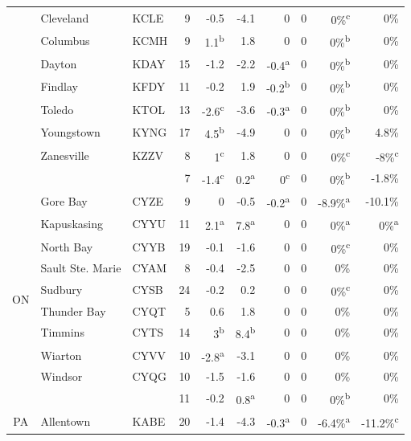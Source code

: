 \documentclass[twocol]{ametsoc}
\begin{document}
\begin{landscape}
\begin{table}[]
\begin{tabular}{@{}cllrrrrrrr@{}}
 & Cleveland & KCLE & 9 & -0.5 & -4.1 & 0 & 0 & 0\%\textsuperscript{c} & 0\% \\
 & Columbus & KCMH & 9 & 1.1\textsuperscript{b} & 1.8 & 0 & 0 & 0\%\textsuperscript{b} & 0\% \\
 & Dayton & KDAY & 15 & -1.2 & -2.2 & -0.4\textsuperscript{a} & 0 & 0\%\textsuperscript{b} & 0\% \\
 & Findlay & KFDY & 11 & -0.2 & 1.9 & -0.2\textsuperscript{b} & 0 & 0\%\textsuperscript{b} & 0\% \\
 & Toledo & KTOL & 13 & -2.6\textsuperscript{c} & -3.6 & -0.3\textsuperscript{a} & 0 & 0\%\textsuperscript{b} & 0\% \\
 & Youngstown & KYNG & 17 & 4.5\textsuperscript{b} & -4.9 & 0 & 0 & 0\%\textsuperscript{b} & 4.8\% \\
 & Zanesville & KZZV & 8 & 1\textsuperscript{c} & 1.8 & 0 & 0 & 0\%\textsuperscript{c} & -8\%\textsuperscript{c} \\ \cmidrule(l){2-10} 
 &  &  & 7 & -1.4\textsuperscript{c} & 0.2\textsuperscript{a} & 0\textsuperscript{c} & 0 & 0\%\textsuperscript{b} & -1.8\% \\ \midrule
\multirow{10}{*}{ON} & Gore Bay & CYZE & 9 & 0 & -0.5 & -0.2\textsuperscript{a} & 0 & -8.9\%\textsuperscript{a} & -10.1\% \\
 & Kapuskasing & CYYU & 11 & 2.1\textsuperscript{a} & 7.8\textsuperscript{a} & 0 & 0 & 0\%\textsuperscript{a} & 0\%\textsuperscript{a} \\
 & North Bay & CYYB & 19 & -0.1 & -1.6 & 0 & 0 & 0\%\textsuperscript{c} & 0\% \\
 & Sault Ste. Marie & CYAM & 8 & -0.4 & -2.5 & 0 & 0 & 0\% & 0\% \\
 & Sudbury & CYSB & 24 & -0.2 & 0.2 & 0 & 0 & 0\%\textsuperscript{c} & 0\% \\
 & Thunder Bay & CYQT & 5 & 0.6 & 1.8 & 0 & 0 & 0\% & 0\% \\
 & Timmins & CYTS & 14 & 3\textsuperscript{b} & 8.4\textsuperscript{b} & 0 & 0 & 0\% & 0\% \\
 & Wiarton & CYVV & 10 & -2.8\textsuperscript{a} & -3.1 & 0 & 0 & 0\% & 0\% \\
 & Windsor & CYQG & 10 & -1.5 & -1.6 & 0 & 0 & 0\% & 0\% \\ \cmidrule(l){2-10} 
 &  &  & 11 & -0.2 & 0.8\textsuperscript{a} & 0 & 0 & 0\%\textsuperscript{b} & 0\% \\ \midrule
\multirow{10}{*}{PA} & Allentown & KABE & 20 & -1.4 & -4.3 & -0.3\textsuperscript{a} & 0 & -6.4\%\textsuperscript{a} & -11.2\%\textsuperscript{c} \\

\end{tabular}
\end{table}
\end{landscape}
\end{document}
